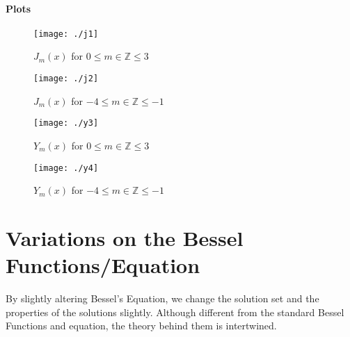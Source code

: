 \documentclass[]{article}
\begin{document}
\subsection{Plots}
\begin{figure}[H]
\centering
\texttt{[image: ./j1]}
\caption{$J_m(x)$ for $ 0 \leq m \in \mathbb{Z} \leq 3$}
\label{fig:j1}
\end{figure}

\begin{figure}[H]
\centering
\texttt{[image: ./j2]}
\caption{$J_m(x)$ for $ -4 \leq m \in \mathbb{Z} \leq -1$}
\label{fig:j2}
\end{figure}

\begin{figure}[H]
\centering
\texttt{[image: ./y3]}
\caption{$Y_m(x)$ for $ 0 \leq m \in \mathbb{Z} \leq 3$}
\label{fig:y3}
\end{figure}

\begin{figure}[H]
\centering
\texttt{[image: ./y4]}
\caption{$Y_m(x)$ for $ -4 \leq m \in \mathbb{Z} \leq -1$}
\label{fig:y4}
\end{figure}



\part{Variations on the Bessel Functions/Equation}
By slightly altering Bessel's Equation, we change the solution set and the properties of the solutions slightly. Although different from the standard Bessel Functions and equation, the theory behind them is intertwined.
\end{document}
